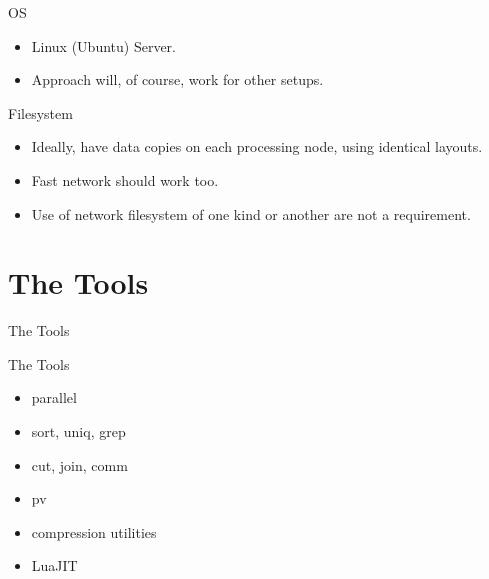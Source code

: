 \documentclass[handout]{beamer}
\begin{document}

\begin{frame}{OS}

\begin{itemize}
\item Linux (Ubuntu) Server.
\item Approach will, of course, work for other setups.
\end{itemize}

\end{frame}


\begin{frame}{Filesystem}

\begin{itemize}
\item Ideally, have data copies on each processing node, using identical
      layouts.
\item Fast network should work too.
\item Use of network filesystem of one kind or another are not a requirement.
\end{itemize}

\end{frame}


\section{The Tools}


\begin{frame}
\huge The Tools
\end{frame}


\begin{frame}{The Tools}

\begin{itemize}
\item parallel
\item sort, uniq, grep
\item cut, join, comm
\item pv
\item compression utilities
\item LuaJIT
\end{itemize}

\end{frame}
\end{document}
